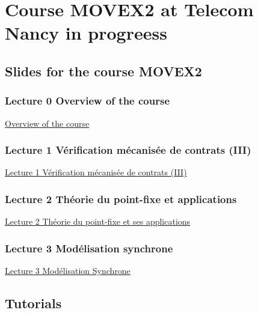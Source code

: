 \documentclass[ 12pt]{article}
\begin{document}
  

\section{Course MOVEX2 at Telecom Nancy in progreess} %
\label{sec:course-mcfsi-at}


\subsection{Slides for the course MOVEX2}
\label{sec:slides}


\subsubsection{Lecture 0  {Overview of the course }}
  
  \href{http://mery54.github.io/teaching/movex/lecturesnotes/movexlecture6.pdf}{Overview of the course }


   \subsubsection{Lecture 1 {Vérification  mécanisée de contrats} (III)}

   \href{http://mery54.github.io/teaching/movex/lecturesnotes/movexlecture7.pdf}{Lecture
     1  Vérification  mécanisée de contrats (III)}

   
   \subsubsection{Lecture 2 {Théorie du point-fixe et applications}}

   \href{http://mery54.github.io/teaching/movex/lecturesnotes/movexlecture8.pdf}{Lecture
     2  Théorie du point-fixe et ses applications}

   
   \subsubsection{Lecture 3 {Modélisation synchrone}}

   \href{http://mery54.github.io/teaching/movex/lecturesnotes/movexlecture9.pdf}{Lecture
     3  Modélisation Synchrone}
   


\subsection{Tutorials}
\end{document}
